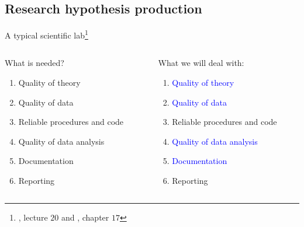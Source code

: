 \subsection{Research hypothesis production}
%
%
\begin{frame}[t, negative]
	\subsectionpage
\end{frame}
%
%
\begin{frame}
	{A typical scientific lab\footnote{\citet{McElreath_2020}, lecture $20$ and \citet{McElreath_2022}, chapter $17$ \nocite{McElreath_2019} \nocite{Hernan_et_al_2020} \nocite{Cunningham_2022} }}
	\begin{columns}
		\begin{column}{0.5\textwidth}
			What is needed?
		
			\begin{enumerate}
				\item Quality of theory
				\item Quality of data
				\item Reliable procedures and code
				\item Quality of data analysis
				\item Documentation
				\item Reporting
			\end{enumerate} 
		\end{column}
		\begin{column}{0.5\textwidth}  
			What we will deal with:
			\begin{enumerate}
				\item \textcolor{blue}{Quality of theory}
				\item \textcolor{blue}{Quality of data}
				\item \alert{Reliable procedures and code}
				\item \textcolor{blue}{Quality of data analysis}
				\item \textcolor{blue}{Documentation}
				\item Reporting
			\end{enumerate} 
		\end{column}
	\end{columns}
\end{frame}
%
%
